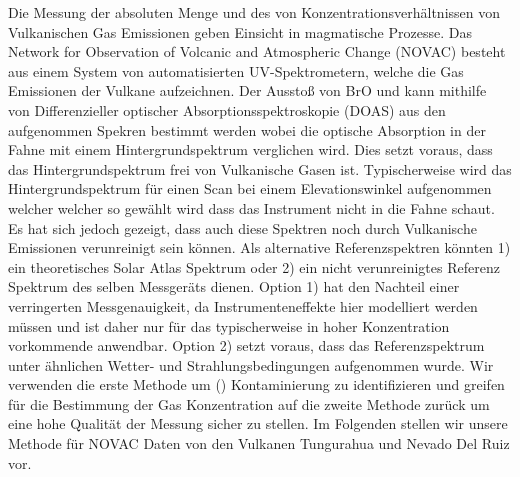 

Die Messung der absoluten Menge und des von Konzentrationsverhältnissen von Vulkanischen Gas Emissionen geben Einsicht in magmatische Prozesse. Das Network for Observation of Volcanic and Atmospheric Change (NOVAC) besteht aus einem System von automatisierten UV-Spektrometern, welche die Gas Emissionen der Vulkane aufzeichnen. Der Ausstoß von BrO und  kann mithilfe von Differenzieller optischer Absorptionsspektroskopie (DOAS) aus den aufgenommen Spekren bestimmt werden wobei die optische Absorption in der Fahne mit einem Hintergrundspektrum verglichen wird. Dies setzt voraus, dass das Hintergrundspektrum frei von Vulkanische Gasen ist. Typischerweise wird das Hintergrundspektrum für einen Scan bei einem Elevationswinkel aufgenommen welcher welcher so gewählt wird dass das Instrument nicht in die Fahne schaut. Es hat sich jedoch gezeigt, dass auch diese Spektren noch durch Vulkanische Emissionen verunreinigt sein können. Als alternative Referenzspektren könnten 1) ein theoretisches Solar Atlas Spektrum oder 2) ein nicht verunreinigtes Referenz Spektrum des selben Messgeräts dienen. Option 1) hat den Nachteil einer verringerten Messgenauigkeit, da Instrumenteneffekte hier modelliert werden müssen und ist daher nur für das typischerweise in hoher Konzentration vorkommende  anwendbar. Option 2) setzt voraus, dass das Referenzspektrum unter ähnlichen Wetter- und Strahlungsbedingungen aufgenommen wurde. Wir verwenden die erste Methode um () Kontaminierung zu identifizieren und greifen für die Bestimmung der Gas Konzentration auf die zweite Methode zurück um eine hohe Qualität der Messung sicher zu stellen. Im Folgenden stellen wir unsere Methode für NOVAC Daten von den Vulkanen Tungurahua und Nevado Del Ruiz vor.